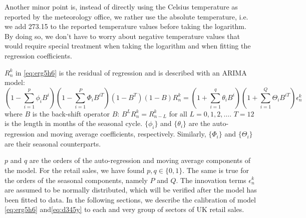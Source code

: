 \documentclass[a4paper,11pt,pdftex,twoside,titlepage]{article}
\begin{document}
Another minor point is, instead of directly using the Celsius
temperature as reported by the meteorology office, we rather use the
absolute temperature, i.e. we add 273.15 to the reported temperature
values before taking the logarithm. By doing so, we don't have to
worry about negative temperature values that would require
special treatment when taking the logarithm and when fitting the
regression coefficients.

$R^k_n$ in \eqref{eq:erg5h6} is the residual of regression and is
described with an ARIMA model:
\begin{equation}
  \label{eq:d345y}
  (1 - \sum_{i=1}^p \phi_i B^i)
  (1 - \sum_{i=1}^P \Phi_i B^{i T})
  (1 - B^T) (1 - B) R^k_n
  =
  (1 + \sum_{i=1}^q \theta_i B^i)
  (1 + \sum_{i=1}^Q \Theta_i B^{i T})
  \epsilon^k_n
\end{equation}
where $B$ is the back-shift operator $B$: $B^L R^k_n = R^k_{n-L}$ for
all $L=0,1,2,\dots$. $T = 12$ is the length in months of the seasonal
cycle. $\{\phi_i\}$ and $\{\theta_i\}$ are the auto-regression and
moving average coefficients, respectively. Similarly, $\{\Phi_i\}$ and
$\{\Theta_i\}$ are their seasonal counterparts.

$p$ and $q$ are the orders of the auto-regression and moving average
components of the model. For the retail sales, we have found $p,q \in
\{0, 1\}$. The same is true for the orders of the seasonal components,
namely $P$ and $Q$. The innovation terms $\epsilon^k_n$ are assumed to
be normally distributed, which will be verified after the model has
been fitted to data. In the following sections, we describe the
calibration of model \eqref{eq:erg5h6} and\eqref{eq:d345y} to each and
very group of sectors of UK retail sales.
\end{document}
